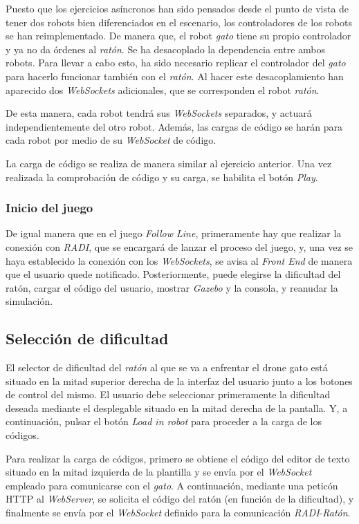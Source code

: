 \documentclass[a4paper, 12pt]{book}
\begin{document}
Puesto que los ejercicios asíncronos han sido pensados desde el punto de vista de tener dos robots bien diferenciados en el escenario, los controladores de los robots se han reimplementado. De manera que, el robot \emph{gato} tiene su propio controlador y ya no da órdenes al \emph{ratón}. Se ha desacoplado la dependencia entre ambos robots. Para llevar a cabo esto, ha sido necesario replicar el controlador del \emph{gato} para hacerlo funcionar también con el \emph{ratón}. Al hacer este desacoplamiento han aparecido dos \emph{WebSockets} adicionales, que se corresponden el robot \emph{ratón}. 

De esta manera, cada robot tendrá sus \emph{WebSockets} separados, y actuará independientemente del otro robot. Además, las cargas de código se harán para cada robot por medio de su \emph{WebSocket} de código.

La carga de código se realiza de manera similar al ejercicio anterior. Una vez realizada la comprobación de código y su carga, se habilita el botón \emph{Play}.

\subsubsection{Inicio del juego}
\label{drone_cat_mouse_inicio}

De igual manera que en el juego \emph{Follow Line}, primeramente hay que realizar la conexión con \emph{RADI}, que se encargará de lanzar el proceso del juego, y, una vez se haya establecido la conexión con los \emph{WebSockets}, se avisa al \emph{Front End} de manera que el usuario quede notificado. Posteriormente, puede elegirse la dificultad del ratón, cargar el código del usuario, mostrar \emph{Gazebo} y la consola,  y reanudar la simulación.

\subsection{Selección de dificultad}
\label{drone_cat_mouse_difficulty}

El selector de dificultad del \emph{ratón} al que se va a enfrentar el drone gato está situado en la mitad superior derecha de la interfaz del usuario junto a los botones de control del mismo. El usuario debe seleccionar primeramente la dificultad deseada mediante el desplegable situado en la mitad derecha de la pantalla. Y, a continuación, pulsar el botón \emph{Load in robot} para proceder a la carga de los códigos.

Para realizar la carga de códigos, primero se obtiene el código del editor de texto situado en la mitad izquierda de la plantilla y se envía por el \emph{WebSocket} empleado para comunicarse con el \emph{gato}. A continuación, mediante una peticón HTTP al \emph{WebServer}, se solicita el código del ratón (en función de la dificultad), y finalmente se envía por el \emph{WebSocket} definido para la comunicación  \emph{RADI}-\emph{Ratón}.
\end{document}
